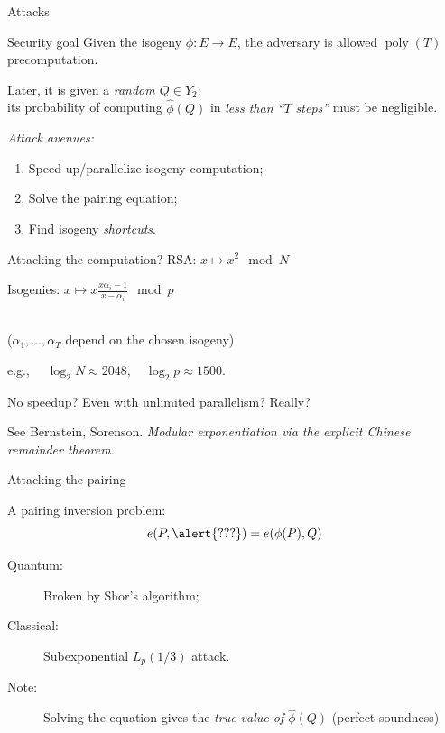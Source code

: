 \documentclass[aspectratio=169]{beamer}
\DeclareMathOperator{\poly}{poly}
\begin{document}

\begin{frame}{Attacks}
  \begin{block}{Security goal}
    Given the isogeny \emph{$\phi:E\to E$}, the adversary is allowed
    $\poly(T)$ precomputation.

    \bigskip
    Later, it is given a \emph{random $Q\in Y_2$}:\\
    its probability of computing \emph{$\hat\phi(Q)$} in \emph{less
      than ``$T$ steps''} must be negligible.
  \end{block}

  \smallskip
  \emph{Attack avenues:}
  \begin{enumerate}
  \item Speed-up/parallelize isogeny computation;
  \item Solve the pairing equation;
  \item Find isogeny \textit{shortcuts}.
  \end{enumerate}
\end{frame}


\begin{frame}{Attacking the computation?}
  \large
  RSA: \hfill $x \longmapsto x^2\mod N$ \hspace{4em}

  \vfill
  Isogenies: \hfill $\displaystyle x \longmapsto x\frac{x\alpha_i-1}{x-\alpha_i}\mod p$ \hspace{4em}\strut\\
  {\normalsize\color{gray} ($\alpha_1,\dots,\alpha_T$ depend on the chosen isogeny)}

  \vfill
  e.g., \emph{$\quad\log_2 N \approx 2048,\quad \log_2 p \approx 1500$}.
  
  \vfill
  \centering
  No speedup? Even with unlimited parallelism? Really?
  
  \medskip
  See Bernstein, Sorenson. \emph{Modular exponentiation via the
    explicit Chinese remainder theorem}.
\end{frame}


\begin{frame}{Attacking the pairing}
  \large

  A pairing inversion problem:
  \[e(P, \alert{???}) = e(\phi(P), Q)\]

  \bigskip
  \begin{description}
  \item[Quantum:] Broken by Shor's algorithm;
  \item[Classical:] Subexponential \emph{$L_p(1/3)$} attack.\\[1em]
  \item[Note:] Solving the equation gives the \emph{true value of
      $\hat\phi(Q)$} (perfect soundness)
  \end{description}
\end{frame}
\end{document}
